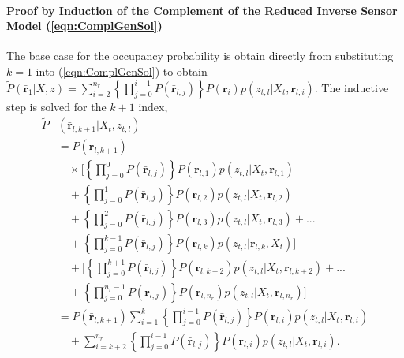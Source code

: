 \documentclass[letterpaper, 10pt, conference]{ieeeconf}
\newcommand{\refeqn}[1]{(\ref{eqn:#1})}
\begin{document}
\begin{appendix}
\paragraph{Proof by Induction of the Complement of the Reduced Inverse Sensor Model \refeqn{ComplGenSol}}
The base case for the occupancy probability is obtain directly from substituting $k=1$ into \refeqn{ComplGenSol} to obtain $\tilde P(\bar{\mathbf{r}}_1|X,z)=\sum_{i=2}^{n_r}\left\{\prod_{j=0}^{i-1}P(\bar{\mathbf{r}}_{l,j})\right\}P(\mathbf{r}_{i})p(z_{t,l}|X_t,\mathbf{r}_{l,i})$.
The inductive step is solved for the $k+1$ index,
\begin{align}
\tilde P&(\bar{\mathbf{r}}_{l,k+1}|X_t,z_{t,l})\nonumber\\
&=
P(\bar{\mathbf{r}}_{l,k+1})\nonumber
\\
&\quad
\times\bigg[
\left\{\prod_{j=0}^{0}P(\bar{\mathbf{r}}_{l,j})\right\}P(\mathbf{r}_{l,1})p(z_{t,l}|X_t,\mathbf{r}_{l,1})\nonumber
\\
&\quad
+
\left\{\prod_{j=0}^{1}P(\bar{\mathbf{r}}_{l,j})\right\}P(\mathbf{r}_{l,2})p(z_{t,l}|X_t,\mathbf{r}_{l,2})\nonumber
\\
&\quad
+\left\{\prod_{j=0}^{2}P(\bar{\mathbf{r}}_{l,j})\right\}P(\mathbf{r}_{l,3})p(z_{t,l}|X_t,\mathbf{r}_{l,3})+...\nonumber
\\
&\quad
+\left\{\prod_{j=0}^{k-1}P(\bar{\mathbf{r}}_{l,j})\right\}P(\mathbf{r}_{l,k})p(z_{t,l}|\mathbf{r}_{l,k},X_t)
\bigg]\nonumber
\\
&\quad
+
\bigg[
\left\{\prod_{j=0}^{k+1}P(\bar{\mathbf{r}}_{l,j})\right\}P(\mathbf{r}_{l,k+2})p(z_{t,l}|X_t,\mathbf{r}_{l,k+2})+...\nonumber
\\
&\quad
+\left\{\prod_{j=0}^{n_r-1}P(\bar{\mathbf{r}}_{l,j})\right\}P(\mathbf{r}_{l,n_r})p(z_{t,l}|X_t,\mathbf{r}_{l,n_r})
\bigg]
\nonumber
\\
&=P(\bar{\mathbf{r}}_{l,k+1})\sum_{i=1}^{k}
\left\{
\prod_{j=0}^{i-1}P(\bar{\mathbf{r}}_{l,j})\right\}P(\mathbf{r}_{l,i})p(z_{t,l}|X_t,\mathbf{r}_{l,i})\nonumber
\\
&\quad
+\sum_{i=k+2}^{n_r}
\left\{
\prod_{j=0}^{i-1}P(\bar{\mathbf{r}}_{l,j})\right\}P(\mathbf{r}_{l,i})p(z_{t,l}|X_t,\mathbf{r}_{l,i})
.
\end{align}


\end{appendix}
\end{document}
